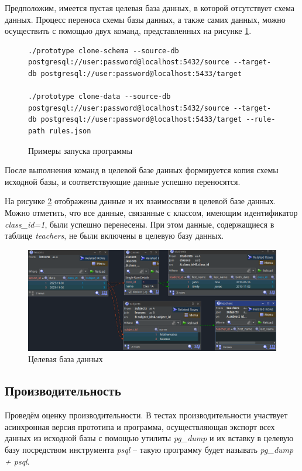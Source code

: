 Предположим, имеется пустая целевая база данных, в которой отсутствует схема данных. Процесс переноса схемы базы данных, а также самих данных, можно осуществить с помощью двух команд, представленных на рисунке \ref{prototype-execute-example}.

\begin{figure}
  \begin{lstlisting}
./prototype clone-schema --source-db postgresql://user:password@localhost:5432/source --target-db postgresql://user:password@localhost:5433/target

./prototype clone-data --source-db postgresql://user:password@localhost:5432/source --target-db postgresql://user:password@localhost:5433/target --rule-path rules.json
  \end{lstlisting}
  \caption{Примеры запуска программы}
  \label{prototype-execute-example}
\end{figure}

После выполнения команд в целевой базе данных формируется копия схемы исходной базы, и соответствующие данные успешно переносятся.

На рисунке \ref{target-db} отображены данные и их взаимосвязи в целевой базе данных. Можно отметить, что все данные, связанные с классом, имеющим идентификатор \textit{class\_id=1}, были успешно перенесены. При этом данные, содержащиеся в таблице \textit{teachers}, не были включены в целевую базу данных.

\begin{figure}
  \includegraphics[scale=0.5]{./img/jailer-target-db-overview.png}
  \caption{Целевая база данных}
  \label{target-db}
\end{figure}

\subsection{Производительность}

Проведём оценку производительности. В тестах производительности участвует асинхронная версия прототипа и программа, осуществляющая экспорт всех данных из исходной базы с помощью утилиты \textit{pg\_dump} и их вставку в целевую базу посредством инструмента \textit{psql} -- такую программу будет называть \textit{pg\_dump + psql}.


